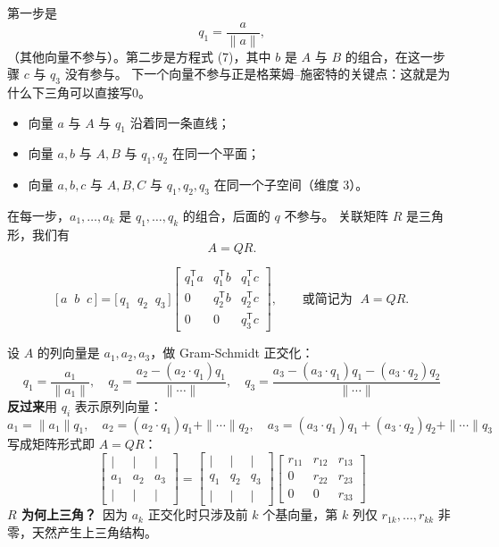 \begin{proposition}
第一步是
\[
q_1 = \frac{a}{\|a\|},
\]
（其他向量不参与）。第二步是方程式 (7)，其中 $b$ 是 $A$ 与 $B$ 的组合，在这一步骤 $c$ 与 $q_3$ 没有参与。  
下一个向量不参与正是格莱姆–施密特的关键点：这就是为什么下三角可以直接写0。

\begin{itemize}
    \item 向量 $a$ 与 $A$ 与 $q_1$ 沿着同一条直线；
    \item 向量 $a,b$ 与 $A,B$ 与 $q_1,q_2$ 在同一个平面；
    \item 向量 $a,b,c$ 与 $A,B,C$ 与 $q_1,q_2,q_3$ 在同一个子空间（维度 3）。
\end{itemize}

在每一步，$a_1,\dots,a_k$ 是 $q_1,\dots,q_k$ 的组合，后面的 $q$ 不参与。  
关联矩阵 $R$ 是三角形，我们有
\[
A = QR.
\]

\[
\bigl[\, a \;\; b \;\; c \,\bigr]
= 
\bigl[\, q_1 \;\; q_2 \;\; q_3 \,\bigr]
\begin{bmatrix}
q_1^{\mathsf T} a & q_1^{\mathsf T} b & q_1^{\mathsf T} c \\[6pt]
0 & q_2^{\mathsf T} b & q_2^{\mathsf T} c \\[6pt]
0 & 0 & q_3^{\mathsf T} c
\end{bmatrix},
\qquad
\text{或简记为 } \; A = QR.
\tag{9}
\]
\end{proposition}
 \begin{note}
设 $A$ 的列向量是 $a_1, a_2, a_3$，做 Gram-Schmidt 正交化：
\[
q_1 = \frac{a_1}{\|a_1\|}, \quad
q_2 = \frac{a_2 - (a_2 \cdot q_1)q_1}{\|\cdots\|}, \quad
q_3 = \frac{a_3 - (a_3 \cdot q_1)q_1 - (a_3 \cdot q_2)q_2}{\|\cdots\|}
\]
\textbf{反过来}用 $q_i$ 表示原列向量：
\[
a_1 = \|a_1\| q_1, \quad
a_2 = (a_2 \cdot q_1)q_1 + \|\cdots\| q_2, \quad
a_3 = (a_3 \cdot q_1)q_1 + (a_3 \cdot q_2)q_2 + \|\cdots\| q_3
\]
写成矩阵形式即 $A = QR$：
\[
\begin{bmatrix} | & | & | \\ a_1 & a_2 & a_3 \\ | & | & | \end{bmatrix}
=
\begin{bmatrix} | & | & | \\ q_1 & q_2 & q_3 \\ | & | & | \end{bmatrix}
\begin{bmatrix} r_{11} & r_{12} & r_{13} \\ 0 & r_{22} & r_{23} \\ 0 & 0 & r_{33} \end{bmatrix}
\]
\textbf{$R$ 为何上三角？}\ 因为 $a_k$ 正交化时只涉及前 $k$ 个基向量，第 $k$ 列仅 $r_{1k},\ldots,r_{kk}$ 非零，天然产生上三角结构。
\end{note}
